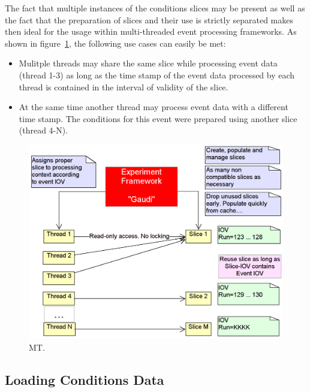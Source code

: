 \documentclass[10pt,a4paper]{article}
\begin{document}
\noindent
The fact that multiple instances of the conditions slices may be present 
as well as the fact that the preparation of slices and their use is strictly
separated makes then ideal for the usage within multi-threaded event 
processing frameworks. As shown in 
figure~\ref{fig:ddcond-multi-threaded-processing}, 
the following use cases can easily be met:
\begin{itemize}
\item Mulitple threads may share the same slice while processing event data
      (thread 1-3) as long as the time stamp of the event data processed 
      by each thread is contained in the interval of validity of the
      slice.
\item At the same time another thread may process event data with a different
      time stamp. The conditions for this event were prepared using another slice
      (thread 4-N).
\end{itemize}

\begin{figure}[t]
  \begin{center}\includegraphics[width=15cm] {DDCond-ConditionsMT}
    \caption{MT.}
    \label{fig:ddcond-multi-threaded-processing}
  \end{center}
\end{figure}
\vspace{-0.5cm}


\subsection{Loading Conditions Data}
\label{subsec:ddcond-data-loading}
\end{document}
